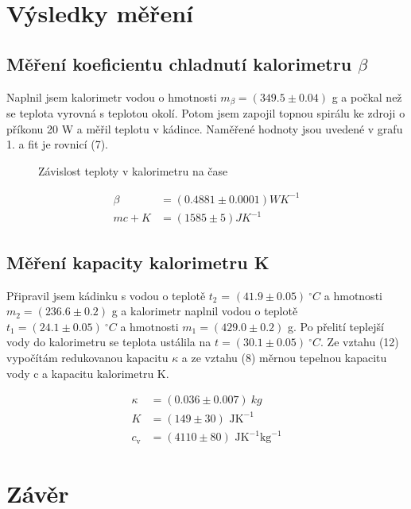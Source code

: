 \documentclass[a4paper,11pt]{article}
\begin{document}
\section{Výsledky měření}

\subsection{Měření koeficientu chladnutí kalorimetru $\beta$}

Naplnil jsem kalorimetr vodou o hmotnosti $m_{\beta} = (349.5 \pm 0.04)$ g a počkal než se teplota vyrovná s teplotou okolí. Potom jsem zapojil topnou spirálu ke zdroji o příkonu 20 W a měřil teplotu v kádince. Naměřené hodnoty jsou uvedené v grafu 1. a fit je rovnicí (7).

\begin{figure}[htpb]
  \centering
  
  \caption{Závislost teploty v kalorimetru na čase}
  \vspace{-30pt}
\end{figure}


\begin{align*}
  \beta &= (0.4881 \pm 0.0001) WK^{-1} \\
  mc + K &= (1585 \pm 5) JK^{-1}
\end{align*}

\vspace{5pt}

\subsection{Měření kapacity kalorimetru K}

Připravil jsem kádinku s vodou o teplotě $t_2$ = $ (41.9 \pm 0.05)\ ^{\circ}C$ a hmotnosti $m_2 = (236.6 \pm 0.2)$ g a kalorimetr naplnil vodou o teplotě $t_1 = (24.1 \pm 0.05)\ ^{\circ}C$ a hmotnosti $m_1 = (429.0 \pm 0.2)$ g. Po přelití teplejší vody do kalorimetru se teplota ustálila na $t=(30.1 \pm 0.05)\ ^{\circ}C$. Ze vztahu (12) vypočítám redukovanou kapacitu $\kappa$ a ze vztahu (8) měrnou tepelnou kapacitu vody c a kapacitu kalorimetru K.


\begin{align*}
  \kappa &= (0.036 \pm 0.007)\ kg \\
  K &= (149 \pm 30) \text{ JK}^{-1} \\
  c_{\text{v}} &=  (4110 \pm 80) \text{ JK}^{-1}\text{kg}^{-1}
\end{align*}

\section{Závěr}
\end{document}
